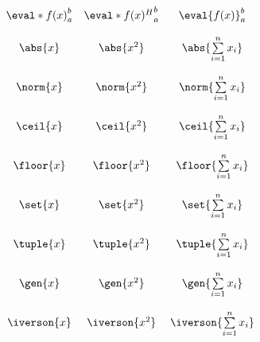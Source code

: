 \documentclass{unittest}
\begin{document}
\(\begin{array}{ccccc}
\\\\%
	\eval*{f(x)}_a^b & \eval*{f(x)^H}_a^b & \eval{f(x)}_a^b
\\\\%
	\abs{x} & \abs{x^2} & \abs{\sum\limits_{i=1}^n x_i}
\\\\%
	\norm{x} & \norm{x^2} & \norm{\sum\limits_{i=1}^n x_i}
\\\\%
	\ceil{x} & \ceil{x^2} & \ceil{\sum\limits_{i=1}^n x_i}
\\\\%
	\floor{x} & \floor{x^2} & \floor{\sum\limits_{i=1}^n x_i}
\\\\%
	\set{x} & \set{x^2} & \set{\sum\limits_{i=1}^n x_i}
\\\\%
	\tuple{x} & \tuple{x^2} & \tuple{\sum\limits_{i=1}^n x_i}
\\\\%
	\gen{x} & \gen{x^2} & \gen{\sum\limits_{i=1}^n x_i}
\\\\%
	\iverson{x} & \iverson{x^2} & \iverson{\sum\limits_{i=1}^n x_i}
\\\\
\end{array}\)
\end{document}
